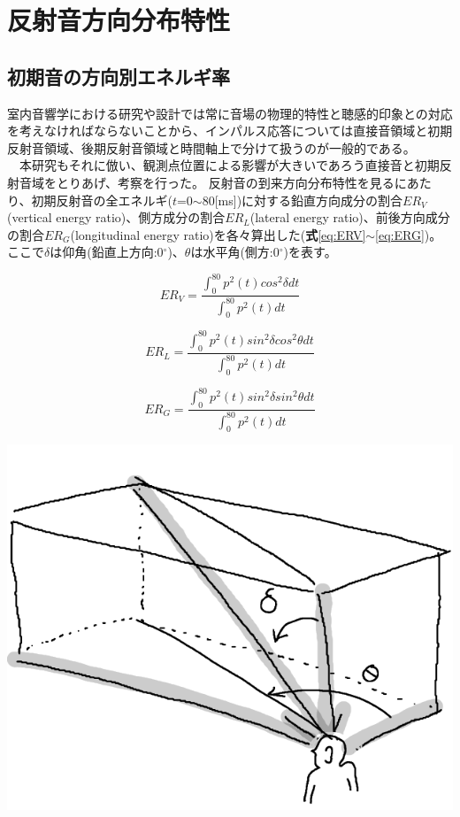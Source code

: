 \chapter{反射音方向分布特性}

\section{初期音の方向別エネルギ率}
室内音響学における研究や設計では常に音場の物理的特性と聴感的印象との対応を考えなければならないことから、インパルス応答については直接音領域と初期反射音領域、後期反射音領域と時間軸上で分けて扱うのが一般的である。
\\　本研究もそれに倣い、観測点位置による影響が大きいであろう直接音と初期反射音域をとりあげ、考察を行った。
反射音の到来方向分布特性を見るにあたり、初期反射音の全エネルギ($t$=0$\sim$80[ms])に対する鉛直方向成分の割合$ER_V$(vertical energy ratio)、側方成分の割合$ER_L$(lateral energy ratio)、前後方向成分の割合$ER_G$(longitudinal energy ratio)を各々算出した(\textbf{式}\ref{eq:ERV}$\sim$\ref{eq:ERG})。ここで$\delta$は仰角(鉛直上方向:0$^\circ$)、$\theta$は水平角(側方:0$^\circ$)を表す。

\begin{table}[htbp]
\begin{equation}
  \label{eq:ERV}
  ER_V = {\frac{\displaystyle\int_0^{80}p^2(t)cos^2{\delta}dt}{\displaystyle\int_0^{80}p^2(t)dt}} 
\end{equation}

\begin{equation}
  \label{eq:ERL}
  ER_L = {\frac{\displaystyle\int_0^{80}p^2(t)sin^2{\delta}cos^2{\theta}dt}{\displaystyle\int_0^{80}p^2(t)dt}} 
\end{equation}

\begin{equation}
  \label{eq:ERG}
  ER_G = {\frac{\displaystyle\int_0^{80}p^2(t)sin^2{\delta}sin^2{\theta}dt}{\displaystyle\int_0^{80}p^2(t)dt}} 
\end{equation}

\centering
\includegraphics[keepaspectratio,scale=1]{04_att/direction.png}
\label{fig:}
\end{table}

